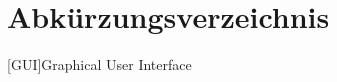 
\chapter*{Abkürzungsverzeichnis}                   %
						         				   

\begin{acronym}[DHBW]


[GUI]{\abkspace Graphical User Interface}

 
\end{acronym}
